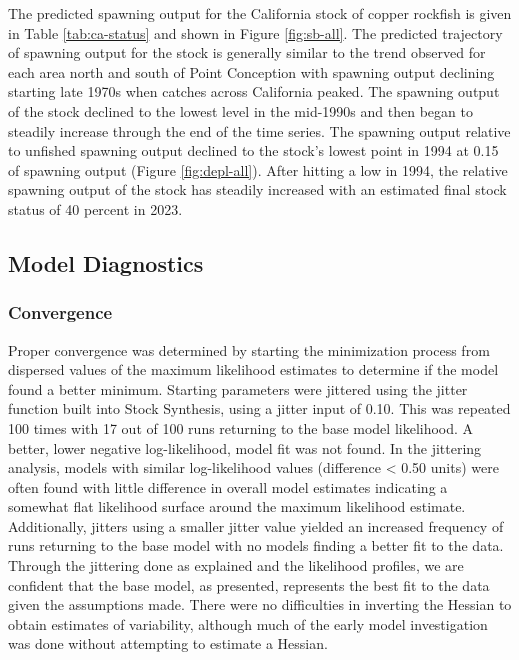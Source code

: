 \documentclass[11pt,
  english,
  letterpaper,
]{article}
\begin{document}
The predicted spawning output for the California stock of copper rockfish is given in Table \ref{tab:ca-status} and shown in Figure \ref{fig:sb-all}. The predicted trajectory of spawning output for the stock is generally similar to the trend observed for each area north and south of Point Conception with spawning output declining starting late 1970s when catches across California peaked. The spawning output of the stock declined to the lowest level in the mid-1990s and then began to steadily increase through the end of the time series. The spawning output relative to unfished spawning output declined to the stock's lowest point in 1994 at 0.15 of spawning output (Figure \ref{fig:depl-all}). After hitting a low in 1994, the relative spawning output of the stock has steadily increased with an estimated final stock status of 40 percent in 2023.

\hypertarget{model-diagnostics}{%
\subsection{Model Diagnostics}\label{model-diagnostics}}

\hypertarget{convergence}{%
\subsubsection{Convergence}\label{convergence}}

Proper convergence was determined by starting the minimization process from dispersed values of the maximum likelihood estimates to determine if the model found a better minimum. Starting parameters were jittered using the jitter function built into Stock Synthesis, using a jitter input of 0.10. This was repeated 100 times with 17 out of 100 runs returning to the base model likelihood. A better, lower negative log-likelihood, model fit was not found. In the jittering analysis, models with similar log-likelihood values (difference \textless{} 0.50 units) were often found with little difference in overall model estimates indicating a somewhat flat likelihood surface around the maximum likelihood estimate. Additionally, jitters using a smaller jitter value yielded an increased frequency of runs returning to the base model with no models finding a better fit to the data. Through the jittering done as explained and the likelihood profiles, we are confident that the base model, as presented, represents the best fit to the data given the assumptions made. There were no difficulties in inverting the Hessian to obtain estimates of variability, although much of the early model investigation was done without attempting to estimate a Hessian.
\end{document}
